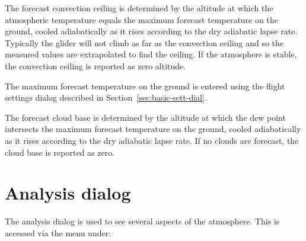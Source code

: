 \documentclass[a4paper,12pt]{refrep}
\begin{document}
The forecast convection ceiling is determined by the altitude at which
the atmospheric temperature equals the maximum forecast temperature on
the ground, cooled adiabatically as it rises according to the dry
adiabatic lapse rate.  Typically the glider will not climb as far as
the convection ceiling and so the measured values are extrapolated to
find the ceiling.  If the atmosphere is stable, the convection ceiling
is reported as zero altitude.

The maximum forecast temperature on the ground is entered using the
flight settings dialog described in Section~\ref{sec:basic-sett-dial}.


%

The forecast cloud base is determined by the altitude at which the dew
point intersects the maximum forecast temperature on the ground,
cooled adiabatically as it rises according to the dry adiabatic lapse
rate.  If no clouds are forecast, the cloud base is reported as zero.


\section{Analysis dialog}

The analysis dialog is used to see several aspects of the atmosphere.
This is accessed via the menu under:
\begin{quote}
\blink{}
\end{quote}
\end{document}
